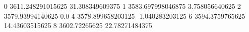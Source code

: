 0 3611.248291015625 31.308349609375
1 3583.697998046875 3.758056640625
2 3579.93994140625 0.0
4 3578.899658203125 -1.040283203125
6 3594.3759765625 14.43603515625
8 3602.72265625 22.78271484375
